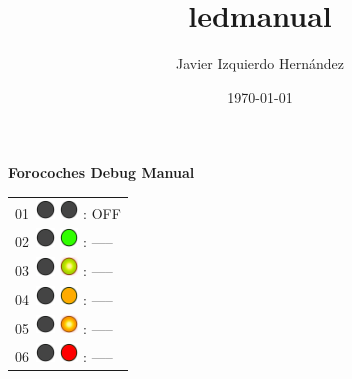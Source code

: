 \documentclass[12pt, a4paper]{report}
\title{ledmanual}
\author{Javier Izquierdo Hernández}
\date{\today}
\begin{document}
	\thispagestyle{empty}
	\centering
	{\bfseries\Huge Forocoches Debug Manual \par}
	\vspace{1cm}
	\begin{minipage}{0.45\textwidth}
	\centering
	\begin{Large}
	
	\begin{tabular}{l}
		01\  \includegraphics*[width=5mm]{off_led} \includegraphics*[width=5mm]{off_led} : OFF\\
		
		02\  \includegraphics*[width=5mm]{off_led} \includegraphics*[width=5mm]{green_led} : -----\\
		
		03\  \includegraphics*[width=5mm]{off_led} \includegraphics*[width=5mm]{green_led_flashing} : -----\\

		04\  \includegraphics*[width=5mm]{off_led} \includegraphics*[width=5mm]{orange_led} : -----\\
		
		05\  \includegraphics*[width=5mm]{off_led} \includegraphics*[width=5mm]{orange_led_flashing} : -----\\
		
		06\  \includegraphics*[width=5mm]{off_led} \includegraphics*[width=5mm]{red_led} : -----\\
		

\end{tabular}
\end{Large}
\end{minipage}
\end{document}
